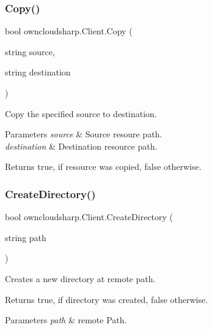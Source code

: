 \subsubsection{\texorpdfstring{Copy()}{Copy()}}
{\footnotesize\ttfamily bool owncloudsharp.\+Client.\+Copy (\begin{DoxyParamCaption}\item[{string}]{source,  }\item[{string}]{destination }\end{DoxyParamCaption})}



Copy the specified source to destination. 


\begin{DoxyParams}{Parameters}
{\em source} & Source resoure path.\\
\hline
{\em destination} & Destination resource path.\\
\hline
\end{DoxyParams}
\begin{DoxyReturn}{Returns}
{\ttfamily true}, if resource was copied, {\ttfamily false} otherwise.
\end{DoxyReturn}
\mbox{\label{classowncloudsharp_1_1_client_a7fa222eebf65ff47a05056b2182c1669}} 
\subsubsection{\texorpdfstring{Create\+Directory()}{CreateDirectory()}}
{\footnotesize\ttfamily bool owncloudsharp.\+Client.\+Create\+Directory (\begin{DoxyParamCaption}\item[{string}]{path }\end{DoxyParamCaption})}



Creates a new directory at remote path. 

\begin{DoxyReturn}{Returns}
{\ttfamily true}, if directory was created, {\ttfamily false} otherwise.
\end{DoxyReturn}

\begin{DoxyParams}{Parameters}
{\em path} & remote Path.\\
\hline
\end{DoxyParams}
\mbox{\label{classowncloudsharp_1_1_client_ae3f6b18765fa47eed193eae4db94ae2c}} 
